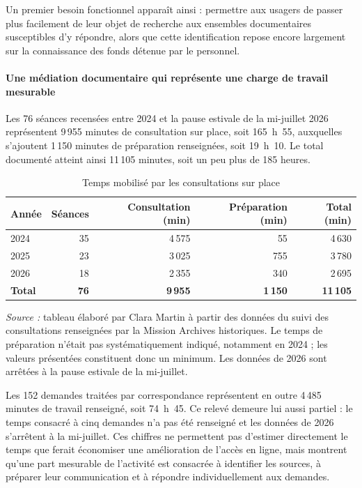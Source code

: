 Un premier besoin fonctionnel apparaît ainsi : permettre aux usagers de passer plus facilement de leur objet de recherche aux ensembles documentaires susceptibles d'y répondre, alors que cette identification repose encore largement sur la connaissance des fonds détenue par le personnel.

\paragraph{Une médiation documentaire qui représente une charge de travail mesurable}

Les 76 séances recensées entre 2024 et la pause estivale de la mi-juillet 2026 représentent 9\,955 minutes de consultation sur place, soit 165~h~55, auxquelles s'ajoutent 1\,150 minutes de préparation renseignées, soit 19~h~10. Le total documenté atteint ainsi 11\,105 minutes, soit un peu plus de 185 heures.

\begin{table}[htbp]
	\centering
	\small
	\caption{Temps mobilisé par les consultations sur place}
	\label{tab:temps-consultations}
	\begin{tabular}{lrrrr}
		\toprule
		\textbf{Année} &
		\textbf{Séances} &
		\textbf{Consultation (min)} &
		\textbf{Préparation (min)} &
		\textbf{Total (min)} \\
		\midrule
		2024 & 35 & 4\,575 & 55  & 4\,630 \\
		2025 & 23 & 3\,025 & 755 & 3\,780 \\
		2026 & 18 & 2\,355 & 340 & 2\,695 \\
		\midrule
		\textbf{Total} & \textbf{76} & \textbf{9\,955} & \textbf{1\,150} & \textbf{11\,105} \\
		\bottomrule
	\end{tabular}
	
	\vspace{0.3em}
	\begin{minipage}{0.93\textwidth}
		\footnotesize
		\emph{Source :} tableau élaboré par Clara Martin à partir des données du suivi des consultations renseignées par la Mission Archives historiques. Le temps de préparation n'était pas systématiquement indiqué, notamment en 2024 ; les valeurs présentées constituent donc un minimum. Les données de 2026 sont arrêtées à la pause estivale de la mi-juillet.
	\end{minipage}
\end{table}

Les 152 demandes traitées par correspondance représentent en outre 4\,485 minutes de travail renseigné, soit 74~h~45. Ce relevé demeure lui aussi partiel : le temps consacré à cinq demandes n'a pas été renseigné et les données de 2026 s'arrêtent à la mi-juillet. Ces chiffres ne permettent pas d'estimer directement le temps que ferait économiser une amélioration de l'accès en ligne, mais montrent qu'une part mesurable de l'activité est consacrée à identifier les sources, à préparer leur communication et à répondre individuellement aux demandes.

